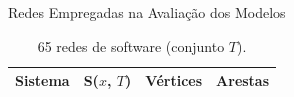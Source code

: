 \begin{chapter}{Redes Empregadas na Avaliação dos Modelos} \label{cap:lista-redes}
%

\begin{center}
\begin{longtable}{| p{10cm} | c | r | r |}
	\caption{65 redes de software (conjunto $T$).}	\\
	\hline
	\textbf{Sistema} & \textbf{S($x$, $T$)} & \textbf{Vértices} & \textbf{Arestas} \\ \hline
	\hline

\end{longtable}
\end{center}
\end{chapter}
